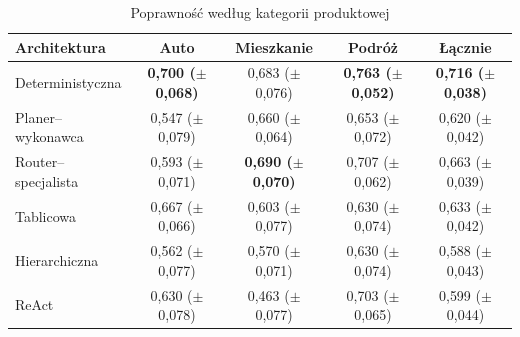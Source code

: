   \begin{table}[H]
    \caption{Poprawność według kategorii produktowej}\label{tab:poprawnosc-kategoria}
    \centering
    \small
    \renewcommand{\arraystretch}{1.3}
    \begin{tabular}{@{} l c c c c @{}}
      \toprule
      \textbf{Architektura}
      & \textbf{Auto}
      & \textbf{Mieszkanie}
      & \textbf{Podróż}
      & \textbf{Łącznie}                                                                                                                              \\
      \midrule
      Deterministyczna    & \textbf{0{,}700 (\(\pm\) 0{,}068)} & 0{,}683 (\(\pm\) 0{,}076)          & \textbf{0{,}763 (\(\pm\) 0{,}052)} & \textbf{0{,}716 (\(\pm\) 0{,}038)} \\
      Planer--wykonawca   & 0{,}547 (\(\pm\) 0{,}079)          & 0{,}660 (\(\pm\) 0{,}064)          & 0{,}653 (\(\pm\) 0{,}072)          & 0{,}620 (\(\pm\) 0{,}042)          \\
      Router--specjalista & 0{,}593 (\(\pm\) 0{,}071)          & \textbf{0{,}690 (\(\pm\) 0{,}070)} & 0{,}707 (\(\pm\) 0{,}062)          & 0{,}663 (\(\pm\) 0{,}039)          \\
      Tablicowa           & 0{,}667 (\(\pm\) 0{,}066)          & 0{,}603 (\(\pm\) 0{,}077)          & 0{,}630 (\(\pm\) 0{,}074)          & 0{,}633 (\(\pm\) 0{,}042)          \\
      Hierarchiczna       & 0{,}562 (\(\pm\) 0{,}077)          & 0{,}570 (\(\pm\) 0{,}071)          & 0{,}630 (\(\pm\) 0{,}074)          & 0{,}588 (\(\pm\) 0{,}043)          \\
      ReAct               & 0{,}630 (\(\pm\) 0{,}078)          & 0{,}463 (\(\pm\) 0{,}077)          & 0{,}703 (\(\pm\) 0{,}065)          & 0{,}599 (\(\pm\) 0{,}044)          \\
      \bottomrule
    \end{tabular}
  \end{table}

